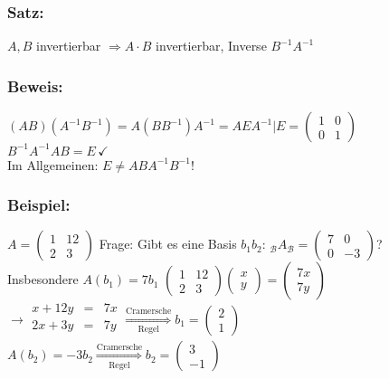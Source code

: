 \subsubsection{Satz:}
$A,B$ invertierbar $\Rightarrow A \cdot B$ invertierbar, Inverse $B^{-1}A^{-1}$
%
%
%
\subsubsection{Beweis:}
$(AB)(A^{-1}B^{-1})=A(BB^{-1})A^{-1}=AEA^{-1}|E=\begin{pmatrix}1 & 0 \\ 0 &1 \end{pmatrix}$\\
$B^{-1}A^{-1}AB=E \, \checkmark$\\
Im Allgemeinen: $E \neq ABA^{-1}B^{-1}$!
%
%
%
\subsubsection{Beispiel:}
$A=\begin{pmatrix} 1 & 12 \\ 2 & 3 \end{pmatrix}$ Frage: Gibt es eine Basis $b_{1}b_{2}: \,  _{\mathcal{B}}A_{\mathcal{B}} = \begin{pmatrix} 7 & 0 \\ 0 & -3 \end{pmatrix}$? \\
Insbesondere $A(b_{1})=7b_{1}$  $\begin{pmatrix}1 & 12 \\ 2 & 3 \end{pmatrix} \begin{pmatrix} x \\ y \end{pmatrix} = \begin{pmatrix} 7x \\ 7y \end{pmatrix}$ \\
$\rightarrow
\begin{array}{rcr}
x + 12y &=& 7x\\
2x + 3y &=& 7y\\
\end{array}
\mathop{\Rightarrow}\limits^{\text{Cramersche}}_{\text{Regel}} b_{1} = \begin{pmatrix} 2 \\ 1 \end{pmatrix}$\\
$A(b_{2}) = -3b_{2} \mathop{\Rightarrow}\limits^{\text{Cramersche}}_{\text{Regel}} b_{2} = \begin{pmatrix} 3 \\ -1 \end{pmatrix}$\\
%
%
%
